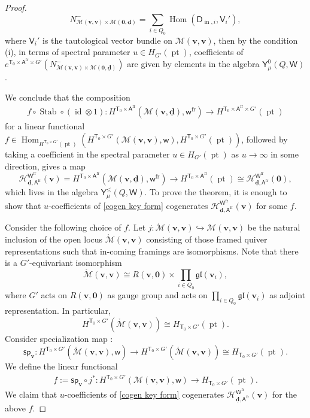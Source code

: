 \documentclass[10pt]{amsart}
\theoremstyle{definition}
\numberwithin{equation}{section}
\newcommand{\bv}{\mathbf{v}}
\newcommand{\bd}{\mathbf{d}}
\newcommand{\cH}{\mathcal{H}}
\newcommand{\cM}{\mathcal{M}}
\newcommand{\sA}{\mathsf{A}}
\newcommand{\sT}{\mathsf{T}}
\newcommand{\sW}{\mathsf{W}}
\newcommand{\sw}{\mathsf{w}}
\newcommand{\Hom}{\operatorname{Hom}}
\newcommand{\pt}{\operatorname{pt}}
\newcommand{\Stab}{\operatorname{Stab}}
\newcommand{\id}{\operatorname{id}}
\newcommand{\In}{\operatorname{in}}
\begin{document}
\begin{proof}
$$N^-_{\cM(\bv,\bv)\times\cM(\mathbf 0,\underline{\bd})}=\sum_{i\in Q_0} \Hom(\mathsf D_{\In,i},\mathsf V_i'),$$ where $\mathsf V_i'$ is the tautological vector bundle on $\cM(\bv,\bv)$, then by the condition (i), in terms of spectral parameter $u\in H_{G'}(\pt)$, coefficients of $e^{\sT_0\times \sA^{\mathrm{fr}}\times G'}\left(N^-_{\cM(\bv,\bv)\times\cM(\mathbf 0,\underline{\bd})}\right)$ are given by elements in the algebra $\mathsf Y^0_\mu(Q,\sW)$. 

We conclude that the composition
\begin{align}\label{cogen key form}
    f\circ \Stab\circ (\id\otimes 1)\colon H^{\sT_0\times \sA^{\mathrm{fr}}}\left(\cM(\bv,\underline{\bd}),\sw^{\mathrm{fr}}\right)\to H^{\sT_0\times \sA^{\mathrm{fr}}\times G'}\left(\pt\right)
\end{align}
for a linear functional $f\in \Hom_{H^{\sT_0\times G'}\left(\pt\right)}\left(H^{\sT_0\times G'}\left(\cM(\bv,\bv),\sw\right), H^{\sT_0\times G'}\left(\pt\right)\right)$, followed by taking a coefficient in the spectral parameter $u\in H_{G'}(\pt)$ as $u\to \infty$ in some direction, gives a map $$\cH^{\sW^{\mathrm{fr}}}_{\underline{\bd},\sA^{\mathrm{fr}}}(\bv)=H^{\sT_0\times \sA^{\mathrm{fr}}}\left( \cM(\bv,\underline{\bd}),\sw^{\mathrm{fr}}\right)\to H^{\sT_0\times \sA^{\mathrm{fr}}}\left(\pt\right)\cong \cH^{\sW^{\mathrm{fr}}}_{\underline{\bd},\sA^{\mathrm{fr}}}(\mathbf 0),$$ which lives in the algebra $\mathsf Y^{\leqslant}_\mu(Q,\sW)$. To prove the theorem, it is enough to show that $u$-coefficients of \eqref{cogen key form} cogenerates $\cH^{\sW^{\mathrm{fr}}}_{\underline{\bd},\sA^{\mathrm{fr}}}(\bv)$ for some $f$.

Consider the following choice of $f$. Let $j\colon \mathring{\cM}(\bv,\bv)\hookrightarrow\cM(\bv,\bv)$ be the natural inclusion of the open locus $\mathring{\cM}(\bv,\bv)$ consisting of those framed quiver representations such that in-coming framings are isomorphisms. Note that there is a $G'$-equivariant isomorphism 
$$\mathring{\cM}(\bv,\bv)\cong R(\bv,\mathbf 0)\times \prod_{i\in Q_0}\mathfrak{gl}(\bv_i),$$ where $G'$ acts on $R(\bv,\mathbf 0)$ as gauge group and acts on $\prod_{i\in Q_0}\mathfrak{gl}(\bv_i)$ as adjoint representation. In particular, $$H^{\sT_0\times G'}\left(\mathring{\cM}(\bv,\bv)\right)\cong H_{\sT_0\times G'}(\pt).$$ 
Consider specialization map \cite[Ex.~7.19]{COZZ}:
$$\mathsf{sp}_{\bv}\colon H^{\sT_0\times G'}\left(\mathring{\cM}(\bv,\bv),\sw\right)\to H^{\sT_0\times G'}\left(\mathring{\cM}(\bv,\bv)\right)\cong H_{\sT_0\times G'}(\pt).$$
We define the linear functional 
\begin{align*}
    f:=\mathsf{sp}_{\bv}\circ j^*\colon H^{\sT_0\times G'}\left(\cM(\bv,\bv),\sw\right)\to H_{\sT_0\times G'}(\pt).
\end{align*}
We claim that $u$-coefficients of \eqref{cogen key form} cogenerates $\cH^{\sW^{\mathrm{fr}}}_{\underline{\bd},\sA^{\mathrm{fr}}}(\bv)$ for the above $f$.


\end{proof}
\end{document}
